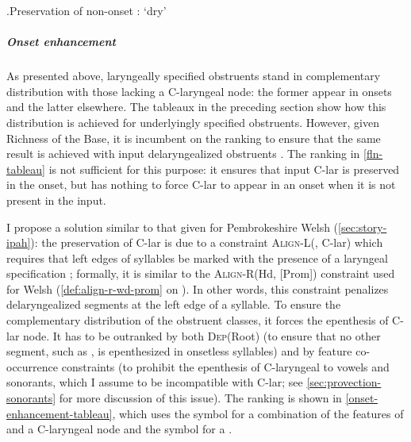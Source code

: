 \ex.\label{h-preservation}Preservation of non-onset \ipa{[h]}: \ipa{[ˈzɛːh]} `dry'\\

\subparagraph{Onset enhancement}
\label{sec:onset-enhancement}

As presented above, laryngeally specified obstruents stand in complementary distribution with those lacking a C-laryngeal node: the former appear in onsets and the latter elsewhere. The tableaux in the preceding section show how this distribution is achieved for underlyingly specified obstruents. However, given Richness of the Base, it is incumbent on the ranking to ensure that the same result is achieved with input delaryngealized obstruents \citep{inkelas94}. The ranking in \ref{fln-tableau} is not sufficient for this purpose: it ensures that input C-lar is preserved in the onset, but has nothing to force C-lar to appear in an onset when it is not present in the input.

I propose a solution similar to that given for Pembrokeshire Welsh \ipa{[h]} (\cref{sec:story-ipah}): the preservation of C-lar is due to a constraint \textsc{Align-L}\hspace{0pt}(\sy, C-lar) which requires that left edges of syllables be marked with the presence of a laryngeal specification \citep[\cfm][]{kramer-breton}; formally, it is similar to the \textsc{Align-R}(Hd, [Prom]) constraint used for Welsh (\cref{def:align-r-wd-prom} on ). In other words, this constraint penalizes delaryngealized segments at the left edge of a syllable. To ensure the complementary distribution of the obstruent classes, it forces the epenthesis of C-lar node. It has to be outranked by both \textsc{Dep}(Root) (to ensure that no other segment, such as \ipa{[h]}, is epenthesized in onsetless syllables) and by feature co-occurrence constraints (to prohibit the epenthesis of C-laryngeal to vowels and sonorants, which I assume to be incompatible with C-lar; see \cref{sec:provection-sonorants} for more discussion of this issue). The ranking is shown in \ref{onset-enhancement-tableau}, which uses the symbol \ipa{[n̬]} for a combination of the features of \ipa{[n]} and a C-laryngeal node and the symbol \ipa{[nʰ]} for a  \ipa{[n]}.

